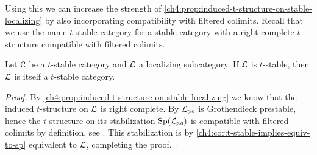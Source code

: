 Using this we can increase the strength of \cref{ch4:prop:induced-t-structure-on-stable-localizing} by also incorporating compatibility with filtered colimits. Recall that we use the name $t$-stable category for a stable category with a right complete $t$-structure compatible with filtered colimits. 

\begin{lemma}
    \label{ch4:lm:localizing-inherits-completeness-and-colimits}
    Let $\EuScript{C}$ be a $t$-stable category and $\mathcal{L}$ a localizing subcategory. If $\mathcal{L}$ is $t$-stable, then $\mathcal{L}$ is itself a $t$-stable category. 
\end{lemma}
\begin{proof}
    By \cref{ch4:prop:induced-t-structure-on-stable-localizing} we know that the induced $t$-structure on $\mathcal{L}$ is right complete. By \cite[C.5.2.1(1)]{lurie_SAG} $\mathcal{L}_{\hspace{-1pt}\scriptscriptstyle\geqslant 0}$ is Grothendieck prestable, hence the $t$-structure on its stabilization $\mathrm{Sp}(\mathcal{L}_{\hspace{-1pt}\scriptscriptstyle\geqslant 0})$ is compatible with filtered colimits by definition, see \cite[C.1.4.1]{lurie_SAG}. This stabilization is by \cref{ch4:cor:t-stable-implies-equiv-to-sp} equivalent to $\mathcal{L}$, completing the proof. 
\end{proof}




